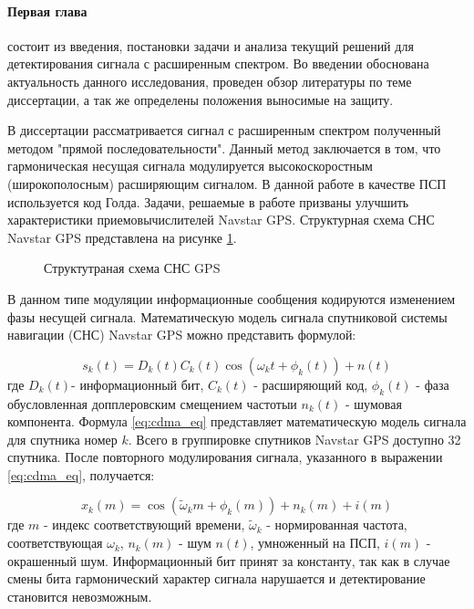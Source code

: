 \paragraph{Первая глава} состоит из введения, постановки задачи и анализа текущий решений для детектирования сигнала с расширенным спектром.
Во введении обоснована актуальность данного исследования, проведен обзор литературы по теме диссертации, а так же
определены положения выносимые на защиту.

В диссертации рассматривается сигнал с расширенным спектром полученный методом "прямой последовательности".
Данный метод заключается в том, что гармоническая несущая сигнала модулируется высокоскоростным (широкополосным)
расширяющим сигналом. В данной работе в качестве ПСП используется код Голда. Задачи, решаемые в работе призваны
улучшить характеристики приемовычислителей Navstar GPS. Структурная схема СНС Navstar GPS представлена на рисунке
\ref{pic:sec1_gnss_system}.

\begin{figure}[H]
	\center{}
	\caption{Структутраная схема СНС GPS}
	\label{pic:sec1_gnss_system}
\end{figure}

В данном типе модуляции информационные сообщения кодируются изменением фазы несущей сигнала.
Математическую модель сигнала спутниковой системы навигации (СНС) Navstar GPS можно представить формулой:

\begin{equation}
	\label{eq:cdma_eq}
	s_k(t)=D_k(t)C_k(t)\cos{(\omega_{k}t + \phi_k(t))} + n(t)
\end{equation}
где ${D_k}(t)$- информационный бит, ${C_k}(t)$ - расширяющий код, ${\phi_k(t)}$ - фаза обусловленная допплеровским смещением частотыи 
${n_k(t)}$ - шумовая компонента. Формула  \ref{eq:cdma_eq} представляет математическую модель сигнала для спутника номер ${k}$.
Всего в группировке спутников Navstar GPS доступно 32 спутника. После повторного модулирования сигнала, указанного в выражении \ref{eq:cdma_eq},
получается:

\begin{equation}
	\label{eq:cdma_strip_eq}
	x_k(m)=\cos{(\tilde{\omega}_{k}m + \phi_k(m))} + n_k(m) +i(m)
\end{equation}
где ${m}$ - индекс соответствующий времени, ${\tilde{\omega}_k}$ - нормированная частота, соответствующая ${\omega_k}$, ${n_k}(m)$ - шум ${n(t)}$, умноженный на ПСП,
${i(m)}$ - окрашенный шум.
Информационный бит принят за константу, так как в случае смены бита гармонический характер сигнала нарушается и детектирование становится невозможным.

